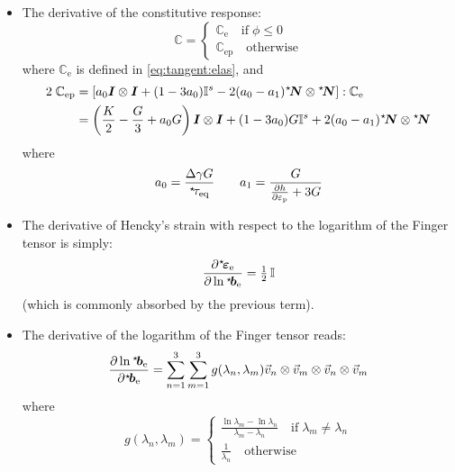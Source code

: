 \documentclass{goose-article}
\newcommand\ST[1]{\hspace*{-.3em}~^\star\!#1}
\newcommand\T[1]{\bm{{#1}}}
\newcommand\TT[1]{\mathbb{{#1}}}
\begin{document}
\begin{itemize}

    \item The derivative of the constitutive response:
    \begin{equation}
        \TT{C} =
        \begin{cases}
            \TT{C}_\mathrm{e} \quad\mathrm{if}\; \phi \leq 0 \\
            \TT{C}_\mathrm{ep} \quad\mathrm{otherwise}
        \end{cases}
    \end{equation}
    where $\TT{C}_\mathrm{e}$ is defined in \cref{eq:tangent:elas}, and
    \begin{align}
        2 \; \TT{C}_\mathrm{ep}
        &= \left[
            a_0 \T{I} \otimes \T{I}
            + (1 - 3 a_0) \TT{I}^s - 2 (a_0 - a_1) \ST{\T{N}} \otimes \ST{\T{N}}
        \right] : \TT{C}_\mathrm{e}
        \\
        &= \left( \frac{K}{2} - \frac{G}{3} + a_0 G \right) \T{I} \otimes \T{I}
        + (1 - 3 a_0) G \TT{I}^s + 2 (a_0 - a_1) \ST{\T{N}} \otimes \ST{\T{N}}
    \end{align}
    where
    \begin{equation}
        a_0 = \frac{\Delta \gamma G}{\ST{\tau}_\mathrm{eq}}
        \qquad
        a_1 = \frac{G}{\frac{\partial h}{\partial \varepsilon_\mathrm{p}} + 3 G}
    \end{equation}

    \item The derivative of Hencky’s strain with respect to the logarithm
    of the Finger tensor is simply:
    \begin{equation}
        \frac{\partial \ST{\T{\varepsilon}}_\mathrm{e}}{\partial \ln \ST{\T{b}}_\mathrm{e}}
        = \tfrac{1}{2} \, \TT{I}
    \end{equation}
    (which is commonly absorbed by the previous term).

    \item The derivative of the logarithm of the Finger tensor reads:
    \begin{equation}
        \frac{\partial \ln \ST{\T{b}}_\mathrm{e}}{\partial \ST{\T{b}}_\mathrm{e}}
        = \sum\limits_{n=1}^3 \sum\limits_{m=1}^3
        g(\lambda_n, \lambda_m) \vec{v}_n \otimes \vec{v}_m \otimes \vec{v}_n \otimes \vec{v}_m
    \end{equation}
    where
    \begin{equation}
        g(\lambda_n, \lambda_m) =
        \begin{cases}
            \displaystyle
            \frac{\ln \lambda_m - \ln \lambda_n}{\lambda_m - \lambda_n}
            \quad\mathrm{if}\; \lambda_m \neq \lambda_n \\
            \displaystyle \frac{1}{\lambda_n}
            \quad\mathrm{otherwise}
        \end{cases}
    \end{equation}


\end{itemize}
\end{document}
